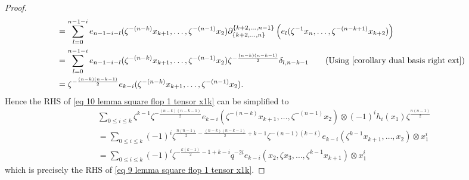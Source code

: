 \begin{proof}
\begin{align*}
      &=\sum_{l=0}^{n-1-i}e_{n-1-i-l}(\zeta^{-(n-k)}x_{k+1}, \ldots ,\zeta^{-(n-1)}x_2)\dd^{\set{k+2, \ldots,n-1}}_{\set{k+2,\ldots,n}}\left( e_l(\zeta^{-1}x_n, \ldots ,\zeta^{-(n-k+1)}x_{k+2})\right)\\
      &=\sum_{l=0}^{n-1-i}e_{n-1-i-l}(\zeta^{-(n-k)}x_{k+1}, \ldots ,\zeta^{-(n-1)}x_2)\zeta^{-\frac{(n-k)(n-k-1)}{2}}\delta_{l, n-k-1} \hspace{20pt}\text{(Using \cref{corollary dual basis right ext})}\\
      &=\zeta^{-\frac{(n-k)(n-k-1)}{2}}e_{k-i}(\zeta^{-(n-k)}x_{k+1}, \ldots ,\zeta^{-(n-1)}x_2).
    \end{align*}
    Hence the RHS of \eqref{eq 10 lemma square flop 1 tensor x1k} can be simplified to
    \begin{align*}
      &\sum_{0\leq i\leq k}\zeta^{k-1}\zeta^{-\frac{(n-k)(n-k-1)}{2}}e_{k-i}(\zeta^{-(n-k)}x_{k+1}, \ldots ,\zeta^{-(n-1)}x_2) \otimes (-1)^ih_i(x_1)\zeta^{\frac{n(n-1)}{2}}  \\
      &=\sum_{0 \leq i \leq k}(-1)^i\zeta^{\frac{n(n-1)}{2}-\frac{(n-k)(n-k-1)}{2}+k-1}\zeta^{-(n-1)(k-i)}e_{k-i}(\zeta^{k-1} x_{k+1}, \ldots ,x_2) \otimes x_1^i\\
     &=\sum_{0\leq i \leq k} (-1)^{i}\zeta^{-\frac{k(k-1)}{2}-1+k-i}
        q^{-2i} e_{k-i}(x_2, \zeta x_3, \ldots, \zeta^{k-1}x_{k+1})\otimes x_1^{i}
    \end{align*}
  which is precisely the RHS of \eqref{eq 9 lemma square flop 1 tensor x1k}.
    \end{proof}
    

